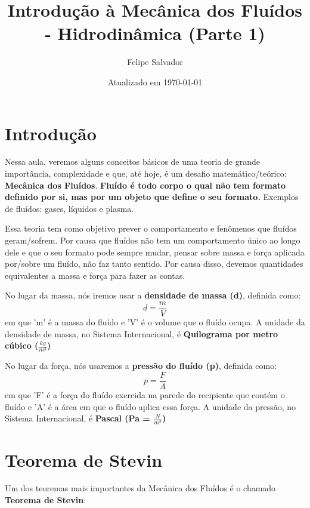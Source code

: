 \documentclass[12pt]{extarticle}
\title{Introdução à Mecânica dos Fluídos - Hidrodinâmica (Parte 1)}
\author{Felipe Salvador}
\date{Atualizado em \today}
\newcommand{\<}{\langle}
\renewcommand{\>}{\rangle}
\theoremstyle{definition}
\begin{document}
\maketitle

\section{Introdução}

Nessa aula, veremos alguns conceitos básicos de uma teoria de grande importância, complexidade e que, até hoje, é um desafio matemático/teórico: \textbf{Mecânica dos Fluídos}. \textbf{Fluído é todo corpo o qual não tem formato definido por si, mas por um objeto que define o seu formato.} Exemplos de fluídos: gases, líquidos e plasma.

Essa teoria tem como objetivo prever o comportamento e fenômenos que fluídos geram/sofrem. Por causa que fluídos não tem um comportamento único ao longo dele e que o seu formato pode sempre mudar, pensar sobre massa e força aplicada por/sobre um fluído, não faz tanto sentido. Por causa disso, devemos quantidades equivalentes a massa e força para fazer as contas.

No lugar da massa, nós iremos usar a \textbf{densidade de massa (d)}, definida como:
\begin{equation}
    d = \frac{m}{V}
\end{equation}
\noindent em que 'm' é a massa do fluído e 'V' é o volume que o fluído ocupa. A unidade da densidade de massa, no Sistema Internacional, é \textbf{Quilograma por metro cúbico ($\frac{kg}{m^3}$)}

No lugar da força, nós usaremos a \textbf{pressão do fluído (p)}, definida como:
\begin{equation}\label{eq:pressao}
    p = \frac{F}{A}
\end{equation}
\noindent em que 'F' é a força do fluído exercida na parede do recipiente que contém o fluído e 'A' é a área em que o fluído aplica essa força. A unidade da pressão, no Sistema Internacional, é \textbf{Pascal (Pa = $\frac{N}{m^2}$)}

\section{Teorema de Stevin}
Um dos teoremas mais importantes da Mecânica dos Fluídos é o chamado \textbf{Teorema de Stevin}: 
\end{document}
